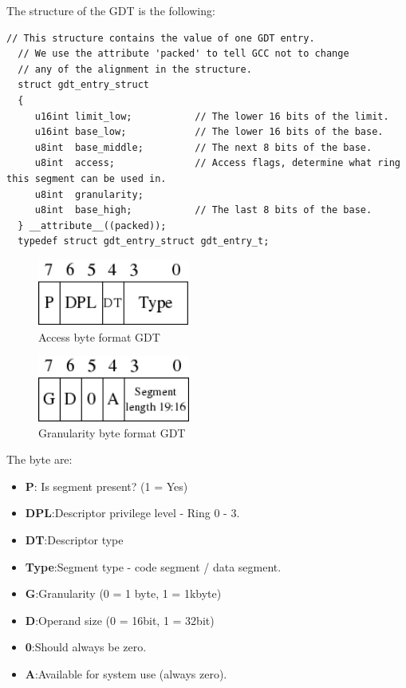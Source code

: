 \documentclass[12pt]{article}
\begin{document}
The structure of the GDT is the following:
\begin{lstlisting}[style=CStyle]
  // This structure contains the value of one GDT entry.
  // We use the attribute 'packed' to tell GCC not to change
  // any of the alignment in the structure.
  struct gdt_entry_struct
  {
     u16int limit_low;           // The lower 16 bits of the limit.
     u16int base_low;            // The lower 16 bits of the base.
     u8int  base_middle;         // The next 8 bits of the base.
     u8int  access;              // Access flags, determine what ring this segment can be used in.
     u8int  granularity;
     u8int  base_high;           // The last 8 bits of the base.
  } __attribute__((packed));
  typedef struct gdt_entry_struct gdt_entry_t;
\end{lstlisting}
\begin{figure}[H]
  \centering
  \includegraphics[width=5cm]{images/gdt.png}
  \caption{Access byte format GDT}
\end{figure}
\begin{figure}[H]
  \centering
  \includegraphics[width=5cm]{images/gdt2.png}
  \caption{Granularity byte format GDT}
\end{figure}
The byte are:
\begin{itemize}
  \item \textbf{P}: Is segment present? (1 = Yes)
  \item \textbf{DPL}:Descriptor privilege level - Ring 0 - 3.
  \item \textbf{DT}:Descriptor type
  \item \textbf{Type}:Segment type - code segment / data segment.
  \item \textbf{G}:Granularity (0 = 1 byte, 1 = 1kbyte)
  \item \textbf{D}:Operand size (0 = 16bit, 1 = 32bit)
  \item \textbf{0}:Should always be zero.
  \item \textbf{A}:Available for system use (always zero).
\end{itemize}
\end{document}
